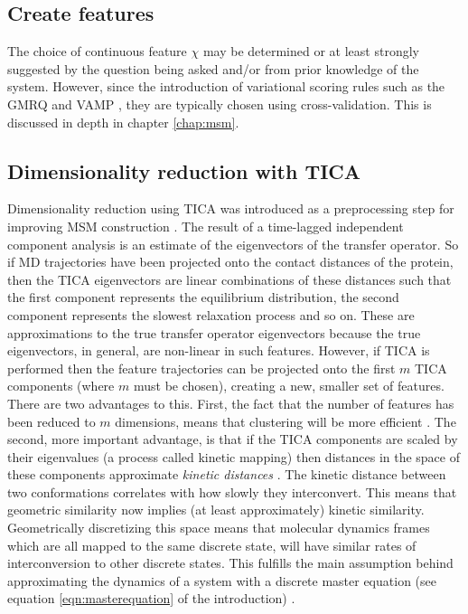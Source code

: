 \subsection{Create features}
The choice of continuous feature $\chi$ may be determined or at least strongly suggested by the question being asked and/or from prior knowledge of the system. However, since the introduction of variational scoring rules such as the GMRQ \cite{mcgibbonVariationalCrossvalidationSlow2015} and VAMP \cite{wuVariationalApproachLearning2020c}, they are typically chosen using cross-validation. This is discussed in depth in chapter \ref{chap:msm}. 

\subsection{Dimensionality reduction with TICA}\label{sec:theory_tica}

Dimensionality reduction using TICA was introduced as a preprocessing step for improving MSM construction \cite{perez-hernandezIdentificationSlowMolecular2013a, schwantesImprovementsMarkovState2013}. The result of a time-lagged independent component analysis is an estimate of the eigenvectors of the transfer operator. So if MD trajectories have been projected onto the contact distances of the protein, then the TICA eigenvectors are linear combinations of these distances such that the first component represents the equilibrium distribution, the second component represents the slowest relaxation process and so on. These are approximations to the true transfer operator eigenvectors because the true eigenvectors, in general, are non-linear in such features.  However, if TICA is performed then the feature trajectories can be projected onto the first $m$ TICA components (where $m$ must be chosen), creating a new, smaller set of features.  There are two advantages to this. First, the fact that the number of features has been reduced to $m$ dimensions, means that clustering will be more efficient \cite{celebiComparativeStudyEfficient2013}.  The second, more important advantage, is that  if the TICA components are scaled by their eigenvalues (a process called kinetic mapping) then distances in the space of these components approximate \emph{kinetic distances} \cite{noeKineticDistanceKinetic2015}. The kinetic distance between two conformations correlates with how slowly they interconvert.  This means that geometric similarity now implies (at least approximately) kinetic similarity. Geometrically discretizing this space means that molecular dynamics frames which are all mapped to the same discrete state, will have similar rates of interconversion to other discrete states. This fulfills the main assumption behind approximating the dynamics of a system with a discrete master equation (see equation \ref{eqn:masterequation} of the introduction) \cite{zwanzigClassicalDynamicsContinuous1983a, noeTransitionNetworksModeling2008}.  


